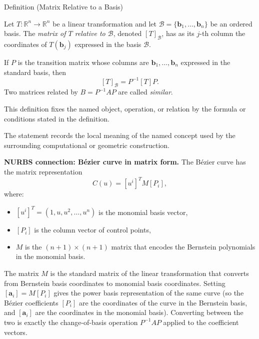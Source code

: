 \begin{definitionbox}{Definition (Matrix Relative to a Basis)}
\begin{definition}
\label{def:matrix-relative-to-basis}
Let $T : \mathbb{R}^n \to \mathbb{R}^n$ be a linear transformation and let
$\mathcal{B} = \{\mathbf{b}_1, \ldots, \mathbf{b}_n\}$ be an ordered basis.
The \emph{matrix of $T$ relative to $\mathcal{B}$}, denoted $[T]_\mathcal{B}$,
has as its $j$-th column the coordinates of $T(\mathbf{b}_j)$ expressed in the
basis $\mathcal{B}$.

If $P$ is the transition matrix whose columns are $\mathbf{b}_1, \ldots, \mathbf{b}_n$
expressed in the standard basis, then
\[
  [T]_\mathcal{B} = P^{-1} [T] P.
\]
Two matrices related by $B = P^{-1}AP$ are called \emph{similar}.
\end{definition}
\end{definitionbox}
\begin{remark*}
This definition fixes the named object, operation, or relation by the formula
or conditions stated in the definition.
\end{remark*}

\begin{remark*}[Interpretation]
The statement records the local meaning of the named concept used by the
surrounding computational or geometric construction.
\end{remark*}

\DefinitionalRoot

\begin{remark*}[Exposition]
\textbf{NURBS connection: B\'{e}zier curve in matrix form.}
The B\'{e}zier curve has the matrix representation
\[
  C(u) = [u^i]^T M [P_i],
\]
where:
\begin{itemize}
  \item $[u^i]^T = (1, u, u^2, \ldots, u^n)$ is the monomial basis vector,
  \item $[P_i]$ is the column vector of control points,
  \item $M$ is the $(n+1)\times(n+1)$ matrix that encodes the Bernstein polynomials
        in the monomial basis.
\end{itemize}
The matrix $M$ is the standard matrix of the linear transformation
that converts from Bernstein basis coordinates to monomial basis coordinates.
Setting $[\mathbf{a}_i] = M[P_i]$ gives the power basis representation of the
same curve (so the B\'{e}zier coefficients $[P_i]$ are the coordinates of the
curve in the Bernstein basis, and $[\mathbf{a}_i]$ are the coordinates in the
monomial basis).
Converting between the two is exactly the change-of-basis operation $P^{-1}AP$
applied to the coefficient vectors.
\end{remark*}
